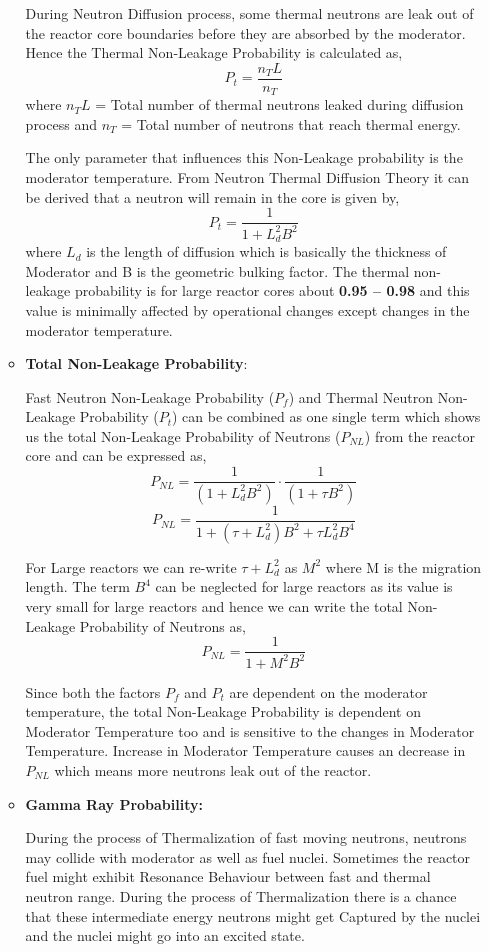 \documentclass{article}
\begin{document}
\begin{itemize}
\begin{itemize}
    During Neutron Diffusion process, some thermal neutrons are leak out of the reactor core boundaries before they are absorbed by the moderator. Hence the Thermal Non-Leakage Probability is calculated as,
    \[P_t = \frac{n_TL}{n_T}\]
    where $n_TL$ = Total number of thermal neutrons leaked during diffusion process and $n_T$ = Total number of neutrons that reach thermal energy.

    The only parameter that influences this Non-Leakage probability is the moderator temperature. From Neutron Thermal Diffusion Theory it can be derived that a neutron will remain in the core is given by,
    \[P_t = \frac{1}{1 + L_d^2B^2}\]
    where $L_d$ is the length of diffusion which is basically the thickness of Moderator and B is the geometric bulking factor.
    The thermal non-leakage probability is for large reactor cores about \textbf{0.95 – 0.98} and this value is minimally affected by operational changes except changes in the moderator temperature.\cite{cite11}

  \item\textbf{ Total Non-Leakage Probability}:

    Fast Neutron Non-Leakage Probability ($P_f$) and Thermal Neutron Non-Leakage Probability ($P_t$) can be combined as one single term which shows us the total Non-Leakage Probability of Neutrons ($P_{NL}$) from the reactor core and can be expressed as,
    \[P_{NL} = \frac{1}{(1 + L_d^2B^2)}\cdot \frac{1}{(1 + \tau B^2)}\]
    \[P_{NL} = \frac{1}{1 + (\tau + L_d^2)B^2 + \tau L_d^2B^4}\]

    For Large reactors we can re-write $\tau + L_d^2$ as $M^2$ where M is the migration length. The term $B^4$ can be neglected for large reactors as its value is very small for large reactors and hence we can write the total Non-Leakage Probability of Neutrons as,
    \[P_{NL} = \frac{1}{1 + M^2B^2}\]

    Since both the factors $P_f$ and $P_t$ are dependent on the moderator temperature, the total Non-Leakage Probability is dependent on Moderator Temperature too and is sensitive to the changes in Moderator Temperature. Increase in Moderator Temperature causes an decrease in $P_{NL}$ which means more neutrons leak out of the reactor.\cite{cite13}

  \item\textbf{ Gamma Ray Probability:}

    During the process of Thermalization of fast moving neutrons, neutrons may collide with moderator as well as fuel nuclei. Sometimes the reactor fuel might exhibit Resonance Behaviour between fast and thermal neutron range. During the process of Thermalization there is a chance that these intermediate energy neutrons might get Captured by the nuclei and the nuclei might go into an excited state.


\end{itemize}
\end{itemize}
\end{document}
